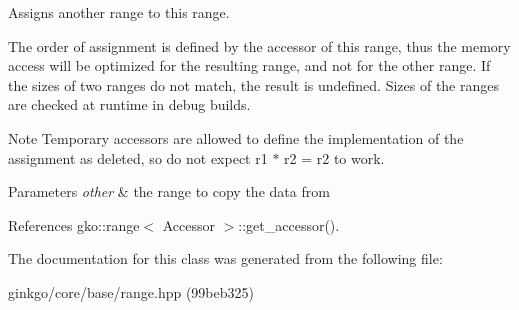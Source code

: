 Assigns another range to this range. 

The order of assignment is defined by the accessor of this range, thus the memory access will be optimized for the resulting range, and not for the other range. If the sizes of two ranges do not match, the result is undefined. Sizes of the ranges are checked at runtime in debug builds.

\begin{DoxyNote}{Note}
Temporary accessors are allowed to define the implementation of the assignment as deleted, so do not expect {\ttfamily r1 $\ast$ r2 = r2} to work.
\end{DoxyNote}

\begin{DoxyParams}{Parameters}
{\em other} & the range to copy the data from \\
\hline
\end{DoxyParams}


References gko\+::range$<$ Accessor $>$\+::get\+\_\+accessor().



The documentation for this class was generated from the following file\+:\begin{DoxyCompactItemize}
\item 
ginkgo/core/base/range.\+hpp (99beb325)\end{DoxyCompactItemize}
